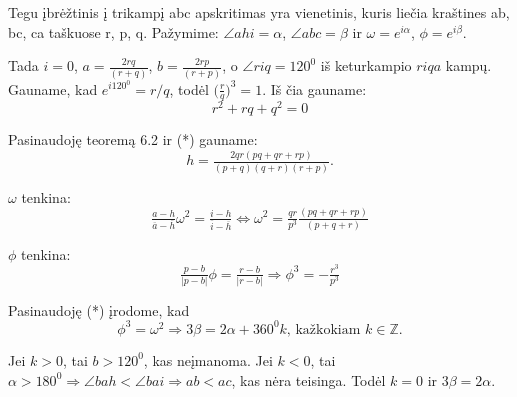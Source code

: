 \begin{sprendimas}


Tegu įbrėžtinis į trikampį abc apskritimas yra vienetinis, kuris liečia kraštines ab, bc, ca taškuose r, p, q. Pažymime: $\angle ahi = \alpha$, $\angle abc = \beta$ ir $\omega = e^{i\alpha}$, $\phi = e^{i\beta}$.

Tada $i=0$, $a=\tfrac{2rq}{(r+q)}$, $b=\tfrac{2rp}{(r+p)}$, o $\angle riq=120^0$ iš keturkampio $riqa$ kampų. Gauname, kad $e^{i120^0}=r/q$, todėl $\Big(\tfrac{r}{q}\Big)^3=1$. Iš čia gauname:
\begin{equation*}
r^2 + rq + q^2 = 0 \tag{*}
\end{equation*}

Pasinaudoję teoremą 6.2 ir (*) gauname:
\begin{equation*}
h=\tfrac{2qr(pq +qr+rp)}{(p+q)(q+r)(r+p)}.
\end{equation*}

$\omega$ tenkina:
\begin{equation*}
\tfrac{a-h}{\overline{a}-\overline{h}}\omega^2=\tfrac{i-h}{\overline{i}-\overline{h}} \Leftrightarrow \omega^2=\tfrac{qr}{p^3}\tfrac{(pq +qr+rp)}{(p+q+r)}
\end{equation*}

$\phi$ tenkina:
\begin{equation*}
\tfrac{p-b}{|p-b|}\phi=\tfrac{r-b}{|r-b|} \Rightarrow \phi^3=-\tfrac{r^3}{p^3}
\end{equation*}

Pasinaudoję (*) įrodome, kad 
\begin{equation*}
\phi^3=\omega^2 \Rightarrow 3\beta=2\alpha + 360^0k \text{, kažkokiam } k\in\mathbb{Z}.
\end{equation*}

Jei $k>0$, tai $b>120^0$, kas neįmanoma. Jei $k<0$, tai $\alpha > 180^0 \Rightarrow \angle bah < \angle bai \Rightarrow ab<ac$, kas nėra teisinga. Todėl $k=0$ ir $3\beta=2\alpha$.
\end{sprendimas}


